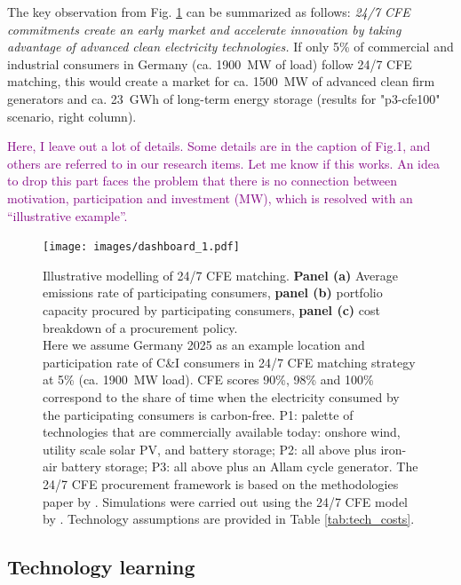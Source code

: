 \documentclass[pdflatex,sn-basic, Numbered]{sn-jnl}%
\theoremstyle{thmstyleone}%
\theoremstyle{thmstyletwo}%
\theoremstyle{thmstylethree}%
\newcommand{\comment}[1]{\textcolor{purple}{#1}}
\begin{document}
The key observation from Fig. \ref{fig:dashboard} can be summarized as follows: \textit{24/7 CFE commitments create an early market and accelerate innovation by taking advantage of advanced clean electricity technologies.} If only 5\% of commercial and industrial consumers in Germany (ca. 1900~MW of load) follow 24/7 CFE matching, this would create a market for ca. 1500~MW of advanced clean firm generators and ca. 23~GWh of long-term energy storage (results for "p3-cfe100" scenario, right column).

\noindent\comment{Here, I leave out a lot of details. Some details are in the caption of Fig.1, and others are referred to in our research items. Let me know if this works. An idea to drop this part faces the problem that there is no connection between motivation, participation and investment (MW), which is resolved with an \enquote{illustrative example}.}

\begin{figure}[htbp]
    \centering
    \texttt{[image: images/dashboard\_1.pdf]}
    \captionsetup{width=0.85\textwidth}
    \caption{Illustrative modelling of 24/7 CFE matching.
    \textbf{Panel (a)} Average emissions rate of participating consumers,
    \textbf{panel (b)} portfolio capacity procured by participating consumers,
    \textbf{panel (c)} cost breakdown of a procurement policy.\\
    Here we assume Germany 2025 as an example location and participation rate of C\&I consumers in 24/7 CFE matching strategy at 5\% (ca. 1900~MW load).
    CFE scores 90\%, 98\% and 100\% correspond to the share of time when the electricity consumed by the participating consumers is carbon-free.
    P1: palette of technologies that are commercially available today: onshore wind, utility scale solar PV, and battery storage; P2: all above plus iron-air battery storage; P3: all above plus an Allam cycle generator. The 24/7 CFE procurement framework is based on the methodologies paper by \citet{google-methodologies}. Simulations were carried out using the 24/7 CFE model by \citet{riepin-zenodo-systemlevel247}. Technology assumptions are provided in Table \ref{tab:tech_costs}.\\
    }\label{fig:dashboard}
\end{figure}


\subsection*{Technology learning}\label{sec3}
\end{document}
